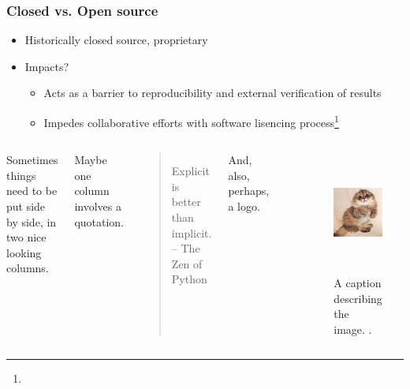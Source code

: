 \begin{frame}
    \frametitle{Closed vs. Open source}

    \begin{itemize}
        \item Historically closed source, proprietary
        \item Impacts?
        \pause\medskip
        \begin{itemize}
            \item Acts as a barrier to reproducibility and external verification of results
            \item Impedes collaborative efforts with software lisencing process\footnote{}
        \end{itemize}
    \end{itemize}

\end{frame}
        \begin{columns}
                \column[t]{5cm}
                Sometimes things need to be put side by side, in two nice 
                looking columns. 

                Maybe one column involves a quotation.

                \begin{quote}
                        Explicit is better than implicit. -- The Zen of Python
                \end{quote}


                And, also, perhaps, a logo.
                \begin{center}
                        \includegraphics[height=0.2\textheight]{./images/arfc-logo}
                \end{center}
                \column[t]{5cm}
        \begin{figure}[htbp!]
        \begin{center}
      \includegraphics[height=4cm]{./images/kitten}
    \end{center}
          \caption{A caption describing the image. \cite{lastname_firstword_1900}.}
    \label{fig:kittenfigure}
  \end{figure}
        \end{columns}
